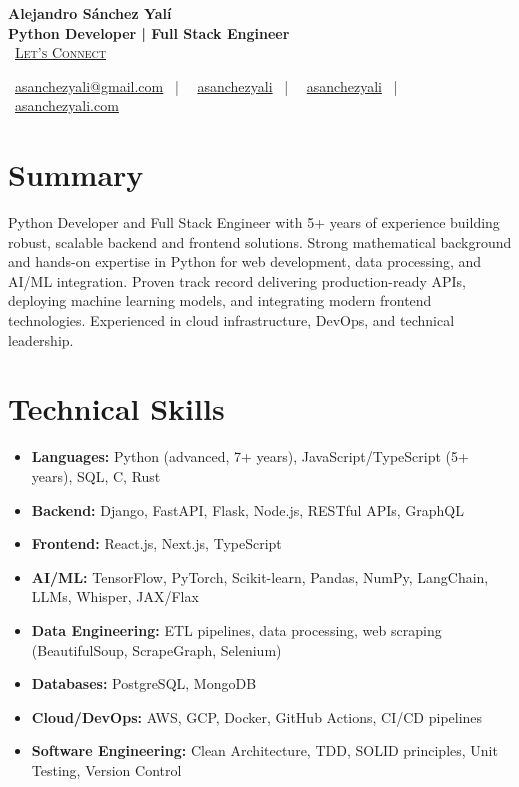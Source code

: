 \documentclass[letterpaper,11pt]{article}
\newcommand{\normalfaCalendar}{{\mdseries\faCalendar}}
\newcommand{\normalfaEnvelope}{{\mdseries\faEnvelope}}
\newcommand{\normalfaLinkedin}{{\mdseries\faLinkedin}}
\newcommand{\normalfaGithub}{{\mdseries\faGithub}}
\newcommand{\normalfaGlobe}{{\mdseries\faGlobe}}
\begin{document}
\begin{center}
\textbf{\Huge Alejandro Sánchez Yalí}\\[0.2em]
\textbf{\Large Python Developer | Full Stack Engineer}\\[0.4em]
\small
\normalfaCalendar\ \href{https://cal.com/asanchezyali/full-time-opportunities}{\textsc{Let's Connect}}

\vspace{0.8em}
\normalfaEnvelope\ \href{mailto:asanchezyali@gmail.com}{asanchezyali@gmail.com}  ~|~
\normalfaLinkedin\ \href{https://www.linkedin.com/in/asanchezyali}{asanchezyali} ~|~
\normalfaGithub\ \href{https://github.com/asanchezyali}{asanchezyali}  ~|~
\normalfaGlobe\ \href{https://asanchezyali.com}{asanchezyali.com}
\end{center}

\section{Summary}
Python Developer and Full Stack Engineer with 5+ years of experience building robust, scalable backend and frontend solutions. Strong mathematical background and hands-on expertise in Python for web development, data processing, and AI/ML integration. Proven track record delivering production-ready APIs, deploying machine learning models, and integrating modern frontend technologies. Experienced in cloud infrastructure, DevOps, and technical leadership.

\section{Technical Skills}
\begin{itemize}[leftmargin=*, itemsep=0pt]
  \item \textbf{Languages:} Python (advanced, 7+ years), JavaScript/TypeScript (5+ years), SQL, C, Rust
  \item \textbf{Backend:} Django, FastAPI, Flask, Node.js, RESTful APIs, GraphQL
  \item \textbf{Frontend:} React.js, Next.js, TypeScript
  \item \textbf{AI/ML:} TensorFlow, PyTorch, Scikit-learn, Pandas, NumPy, LangChain, LLMs, Whisper, JAX/Flax
  \item \textbf{Data Engineering:} ETL pipelines, data processing, web scraping (BeautifulSoup, ScrapeGraph, Selenium)
  \item \textbf{Databases:} PostgreSQL, MongoDB
  \item \textbf{Cloud/DevOps:} AWS, GCP, Docker, GitHub Actions, CI/CD pipelines
  \item \textbf{Software Engineering:} Clean Architecture, TDD, SOLID principles, Unit Testing, Version Control
\end{itemize}
\end{document}
